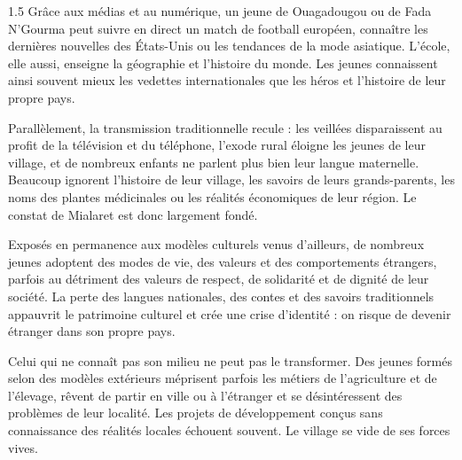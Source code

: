 \documentclass[12pt]{article}
\begin{document}
\begin{spacing}{1.5}
Grâce aux médias et au numérique, un jeune de Ouagadougou ou de Fada N'Gourma peut suivre en direct un match de football européen, connaître les dernières nouvelles des États-Unis ou les tendances de la mode asiatique. L'école, elle aussi, enseigne la géographie et l'histoire du monde. Les jeunes connaissent ainsi souvent mieux les vedettes internationales que les héros et l'histoire de leur propre pays.

Parallèlement, la transmission traditionnelle recule : les veillées disparaissent au profit de la télévision et du téléphone, l'exode rural éloigne les jeunes de leur village, et de nombreux enfants ne parlent plus bien leur langue maternelle. Beaucoup ignorent l'histoire de leur village, les savoirs de leurs grands-parents, les noms des plantes médicinales ou les réalités économiques de leur région. Le constat de Mialaret est donc largement fondé.



Exposés en permanence aux modèles culturels venus d'ailleurs, de nombreux jeunes adoptent des modes de vie, des valeurs et des comportements étrangers, parfois au détriment des valeurs de respect, de solidarité et de dignité de leur société. La perte des langues nationales, des contes et des savoirs traditionnels appauvrit le patrimoine culturel et crée une crise d'identité : on risque de devenir étranger dans son propre pays.

Celui qui ne connaît pas son milieu ne peut pas le transformer. Des jeunes formés selon des modèles extérieurs méprisent parfois les métiers de l'agriculture et de l'élevage, rêvent de partir en ville ou à l'étranger et se désintéressent des problèmes de leur localité. Les projets de développement conçus sans connaissance des réalités locales échouent souvent. Le village se vide de ses forces vives.




\end{spacing}
\end{document}
